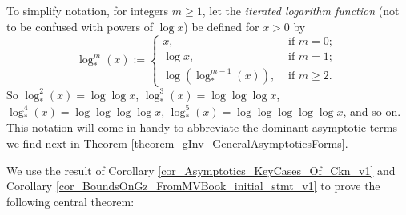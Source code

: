 \documentclass[11pt,reqno,a4letter]{article}
\numberwithin{figure}{section}
\numberwithin{table}{section}
\theoremstyle{plain}
\numberwithin{theorem}{section}
\theoremstyle{definition}
\begin{document}
To simplify notation, for integers $m \geq 1$, let the \emph{iterated logarithm function} 
(not to be confused with powers of $\log x$) be defined for $x > 0$ by 
\[
\log_{\ast}^{m}(x) := \begin{cases} 
     x, & \text{ if $m = 0$; } \\ 
     \log x, & \text{ if $m = 1$; } \\ 
     \log\left(\log_{\ast}^{m-1}(x)\right), & \text{ if $m \geq 2$. } 
     \end{cases}
\]
So $\log_{\ast}^2(x) = \log\log x$, $\log_{\ast}^3(x) = \log\log\log x$, 
$\log_{\ast}^4(x) = \log\log\log\log x$, $\log_{\ast}^5(x) = \log\log\log\log\log x$, and so on. 
This notation will come in handy to abbreviate the dominant asymptotic terms we find next in 
Theorem \ref{theorem_gInv_GeneralAsymptoticsForms}. 

We use the result of 
Corollary \ref{cor_Asymptotics_KeyCases_Of_Ckn_v1} and 
Corollary \ref{cor_BoundsOnGz_FromMVBook_initial_stmt_v1} 
to prove the following central theorem: 
\end{document}
